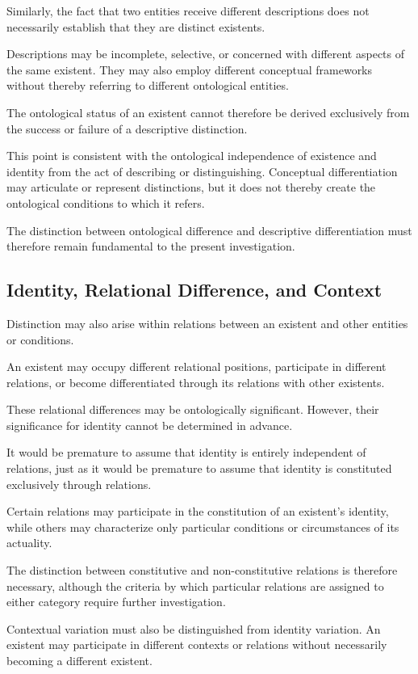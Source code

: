 Similarly, the fact that two entities receive
different descriptions does not necessarily
establish that they are distinct existents.

Descriptions may be incomplete, selective,
or concerned with different aspects of the
same existent. They may also employ different
conceptual frameworks without thereby
referring to different ontological entities.

The ontological status of an existent cannot
therefore be derived exclusively from the
success or failure of a descriptive distinction.

This point is consistent with the ontological
independence of existence and identity from
the act of describing or distinguishing.
Conceptual differentiation may articulate
or represent distinctions, but it does not
thereby create the ontological conditions
to which it refers.

The distinction between ontological difference
and descriptive differentiation must therefore
remain fundamental to the present investigation.

\subsection{Identity, Relational Difference, and Context}

Distinction may also arise within relations
between an existent and other entities or
conditions.

An existent may occupy different relational
positions, participate in different relations,
or become differentiated through its relations
with other existents.

These relational differences may be
ontologically significant. However, their
significance for identity cannot be determined
in advance.

It would be premature to assume that identity
is entirely independent of relations, just as
it would be premature to assume that identity
is constituted exclusively through relations.

Certain relations may participate in the
constitution of an existent's identity, while
others may characterize only particular
conditions or circumstances of its actuality.

The distinction between constitutive and
non-constitutive relations is therefore
necessary, although the criteria by which
particular relations are assigned to either
category require further investigation.

Contextual variation must also be distinguished
from identity variation. An existent may
participate in different contexts or relations
without necessarily becoming a different
existent.

